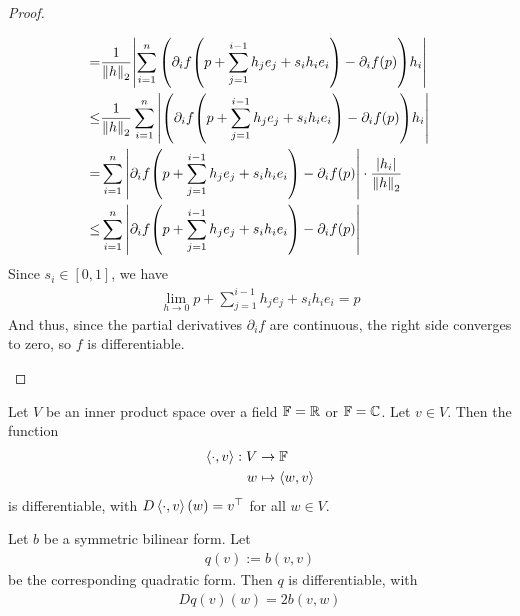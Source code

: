 \begin{proof}
\begin{enumerate}
\begin{align*}
			=
			&\frac{1}{\norm{h}_2}
			\abs{\sum_{i = 1}^n \qty(\partial_i f\qty(p + \sum_{j = 1}^{i-1} h_je_j + s_ih_ie_i) - \partial_i f(p)) h_i}\\
			\leq
			&\frac{1}{\norm{h}_2}
			\sum_{i = 1}^n \abs{\qty(\partial_i f\qty(p + \sum_{j = 1}^{i-1} h_je_j + s_ih_ie_i) - \partial_i f(p)) h_i}\\
			=
			&
			\sum_{i = 1}^n \abs{\partial_i f\qty(p + \sum_{j = 1}^{i-1} h_je_j + s_ih_ie_i) - \partial_i f(p)} \cdot \frac{\abs{h_i}}{\norm{h}_2}\\
			\leq
			&
			\sum_{i = 1}^n \abs{\partial_i f\qty(p + \sum_{j = 1}^{i-1} h_je_j + s_ih_ie_i) - \partial_i f(p)}
		\end{align*}
		Since $s_i \in [0,1]$, we have
		\begin{align*}
			\lim_{h \to 0} p + \sum_{j = 1}^{i-1} h_je_j + s_ih_ie_i = p
		\end{align*}
		And thus, since the partial derivatives $\partial_i f$ are continuous, the right side converges to zero, so $f$ is differentiable.
	\end{enumerate}
\end{proof}
\begin{exercise}
	Let $V$ be an inner product space over a field $\mathbb{F} = \mathbb{R}$ or $\mathbb{F} = \mathbb{C}$. Let $v \in V$. Then the function 
	\begin{align*}
		\left\langle \cdot, v \right\rangle : V &\to \mathbb{F}\\
		w &\mapsto \left\langle w, v \right\rangle
	\end{align*}
	is differentiable, with $D\left\langle \cdot, v \right\rangle(w) = v^\top$ for all $w \in V$.
\end{exercise}
\begin{exercise}
	Let $b$ be a symmetric bilinear form. Let
	\begin{align*}
		q(v) := b(v,v)
	\end{align*}
	be the corresponding quadratic form. Then
	$q$ is differentiable, with
	\begin{align*}
		Dq(v)(w) = 2b(v,w)
	\end{align*}
\end{exercise}
\clearpage

